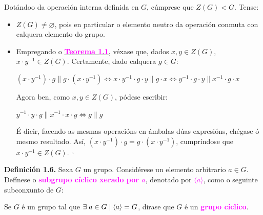 \documentclass[twoside]{report}
\newcommand{\magbf}[1]{\textcolor{magenta}{\textbf{#1}}} %
\theoremstyle{mystyle}
\begin{document}
\noindent Dotándoo da operación interna definida en $G$, cúmprese que $Z(G) < G$. Tense:

\begin{itemize}
    \item $Z(G) \neq \varnothing$, pois en particular o elemento neutro da operación conmuta con calquera elemento do grupo.
    \item Empregando o \hyperref[th1.1]{\magbf{Teorema 1.1}}, véxase que, dados $x,y \in Z(G)$, $x \cdot y^{-1} \in Z(G)$. Certamente, dado calquera $g \in G$:
    
    $(x \cdot y^{-1}) \cdot g \parallel g \cdot (x \cdot y^{-1}) \Longleftrightarrow x \cdot y^{-1} \cdot g \cdot y \parallel g \cdot x \Longleftrightarrow y^{-1} \cdot g \cdot y \parallel x^{-1} \cdot g \cdot x$
    
    Agora ben, como $x,y \in Z(G)$, pódese escribir:
    
    $y^{-1} \cdot y \cdot g \parallel x^{-1} \cdot x \cdot g \Longleftrightarrow g \parallel g$
    
    É dicir, facendo as mesmas operacións en ámbalas dúas expresións, chégase ó mesmo resultado. Así, $(x \cdot y^{-1}) \cdot g = g \cdot (x \cdot y^{-1})$, cumpríndose que $x \cdot y^{-1} \in Z(G)$. $\square$
    
\end{itemize}

\vspace{4mm}

\noindent \textbf{Definición 1.6.} Sexa $G$ un grupo. Considérese un elemento arbitrario $a \in G$. Defínese o \textcolor{magenta}{\textbf{subgrupo cíclico xerado por $a$}}, denotado por \textcolor{magenta}{$\langle a \rangle$}, como o seguinte subconxunto de $G$:

\begin{center}
\end{center}

\noindent Se $G$ é un grupo tal que $\exists \hspace{1mm} a \in G \hspace{1mm} | \hspace{1mm} \langle a \rangle = G$, dirase que $G$ é un \textcolor{magenta}{\textbf{grupo cíclico}}.

\vspace{3mm}
\end{document}
